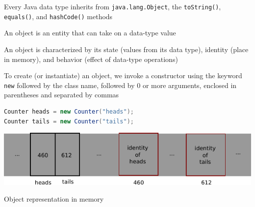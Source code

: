 \documentclass[8pt,a4paper,compress]{beamer}
\begin{document}
\begin{frame}[fragile]
Every Java data type inherits from \lstinline{java.lang.Object}, the \lstinline{toString()}, \lstinline{equals()}, and \lstinline{hashCode()} methods

\bigskip

An object is an entity that can take on a data-type value

\bigskip

An object is characterized by its state (values from its data type), identity (place in memory), and behavior (effect of data-type operations)

\bigskip

To create (or instantiate) an object, we invoke a constructor using the keyword \lstinline{new} followed by the class name, followed by 0 or more arguments, enclosed in parentheses and separated by commas

\begin{lstlisting}[language=Java]
Counter heads = new Counter("heads");
Counter tails = new Counter("tails");
\end{lstlisting}

\begin{center}
\includegraphics[scale=0.8]{./figures/obj_rep.pdf}

\smallskip

\tiny Object representation in memory
\end{center}
\end{frame}
\end{document}
